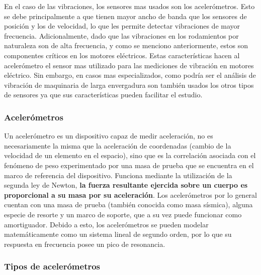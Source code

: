En el caso de las vibraciones, los sensores mas usados son los
acelerómetros.  Esto se debe principalmente a que tienen mayor ancho de banda
que los sensores de posición y los de velocidad, lo que les permite detectar
vibraciones de mayor frecuencia. Adicionalmente, dado que las vibraciones en los
rodamientos por naturaleza son de alta frecuencia, y como se menciono anteriormente,
estos son componentes críticos en los motores eléctricos.
Estas características hacen al acelerómetro el sensor mas utilizado para las
mediciones de vibración en motores eléctrico. Sin embargo,
en casos mas especializados, como podría ser el análisis de vibración
de maquinaria de larga envergadura son también usados los otros tipos de
sensores ya que sus características pueden facilitar el estudio.


\subsubsection{Acelerómetros}

Un acelerómetro es un dispositivo capaz de medir aceleración, no es
necesariamente la misma que la aceleración de coordenadas (cambio de la velocidad de
un elemento en el espacio), sino que es la correlación asociada con el fenómeno
de peso experimentado por una masa de prueba que se
encuentra en el marco de referencia del dispositivo.  Funciona mediante
la utilización de la segunda ley de Newton, \textbf{la fuerza resultante
ejercida sobre un cuerpo es proporcional a su masa por su aceleración}. Los
acelerómetros por lo general cuentan con una masa de prueba (también conocida
como masa sísmica), alguna especie de resorte y un marco de soporte, que a su
vez puede funcionar como amortiguador. Debido a esto, los acelerómetros se
pueden modelar matemáticamente como un sistema lineal de segundo orden,
por lo que su respuesta en frecuencia posee un pico de resonancia.


\subsubsection*{Tipos de acelerómetros}

